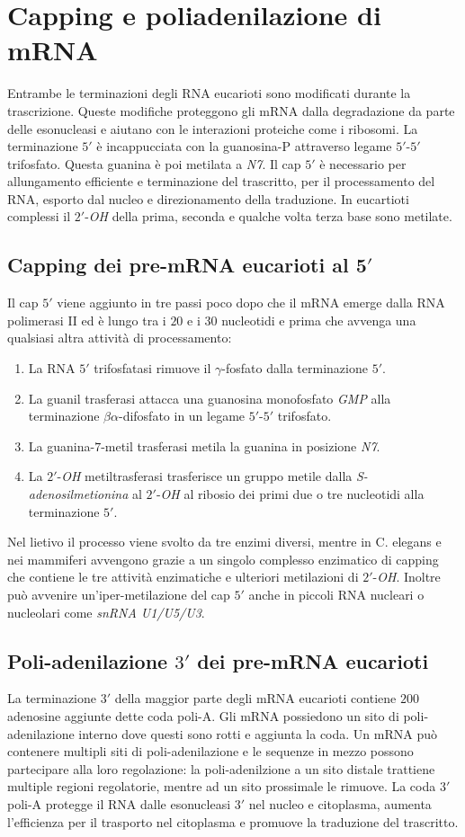 \section{Capping e poliadenilazione di mRNA}
Entrambe le terminazioni degli RNA eucarioti sono modificati durante la trascrizione. Queste modifiche proteggono gli mRNA dalla degradazione da parte delle esonucleasi e aiutano 
con le interazioni proteiche come i ribosomi. La terminazione $5'$ \`e incappucciata con la guanosina-P attraverso legame $5'$-$5'$ trifosfato. Questa guanina \`e poi metilata a
\emph{N7}. Il cap $5'$ \`e necessario per allungamento efficiente e terminazione del trascritto, per il processamento del RNA, esporto dal nucleo e direzionamento della traduzione. In
eucartioti complessi il $2'$-\emph{OH} della prima, seconda e qualche volta terza base sono metilate. 
\subsection{Capping dei pre-mRNA eucarioti al $\mathbf{5'}$}
Il cap $5'$ viene aggiunto in tre passi poco dopo che il mRNA emerge dalla RNA polimerasi II ed \`e lungo tra i $20$ e i $30$ nucleotidi e prima che avvenga una qualsiasi altra 
attivit\`a di processamento: 
\begin{enumerate}
	\item La RNA $5'$ trifosfatasi rimuove il $\gamma$-fosfato dalla terminazione $5'$.
	\item La guanil trasferasi attacca una guanosina monofosfato \emph{GMP} alla terminazione $\beta\alpha$-difosfato in un legame $5'$-$5'$ trifosfato. 
	\item La guanina-$7$-metil trasferasi metila la guanina in posizione \emph{N7}.
	\item La $2'$-\emph{OH} metiltrasferasi trasferisce un gruppo metile dalla \emph{S-adenosilmetionina} al $2'$-\emph{OH} al ribosio dei primi due o tre nucleotidi alla 
		terminazione $5'$. 
\end{enumerate}
Nel lietivo il processo viene svolto da tre enzimi diversi, mentre in C. elegans e nei mammiferi avvengono grazie a un singolo complesso enzimatico di capping che contiene le tre 
attivit\`a enzimatiche e ulteriori metilazioni di $2'$-\emph{OH}. Inoltre pu\`o avvenire un'iper-metilazione del cap $5'$ anche in piccoli RNA nucleari o nucleolari come 
\emph{snRNA U1/U5/U3}.
\subsection{Poli-adenilazione $3'$ dei pre-mRNA eucarioti}
La terminazione $3'$ della maggior parte degli mRNA eucarioti contiene $200$ adenosine aggiunte dette coda poli-A. Gli mRNA possiedono un sito di poli-adenilazione interno dove questi 
sono rotti e aggiunta la coda. Un mRNA pu\`o contenere multipli siti di poli-adenilazione e le sequenze in mezzo possono partecipare alla loro regolazione: la poli-adenilzione
a un sito distale trattiene multiple regioni regolatorie, mentre ad un sito prossimale le rimuove. La coda $3'$ poli-A protegge il RNA dalle esonucleasi $3'$ nel nucleo e citoplasma, 
aumenta l'efficienza per il trasporto nel citoplasma e promuove la traduzione del trascritto. 	
